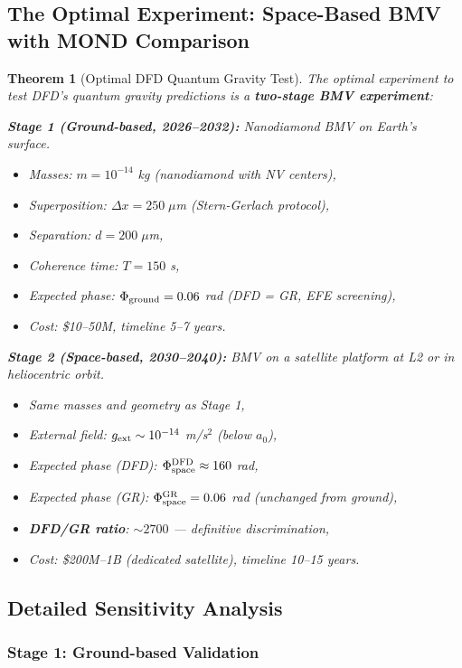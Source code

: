 \documentclass[11pt,a4paper]{article}
\newtheorem{theorem}{Theorem}
\begin{document}
\subsection{The Optimal Experiment: Space-Based BMV with MOND Comparison}

\begin{theorem}[Optimal DFD Quantum Gravity Test]
\label{thm:optimal-experiment}
The optimal experiment to test DFD's quantum gravity predictions is a \textbf{two-stage BMV experiment}:

\textbf{Stage 1 (Ground-based, 2026--2032):} Nanodiamond BMV on Earth's surface.
\begin{itemize}
\item Masses: $m = 10^{-14}$ kg (nanodiamond with NV centers),
\item Superposition: $\Delta x = 250\;\mu$m (Stern-Gerlach protocol),
\item Separation: $d = 200\;\mu$m,
\item Coherence time: $T = 150$ s,
\item Expected phase: $\Phi_{\rm ground} = 0.06$ rad (DFD = GR, EFE screening),
\item Cost: \$10--50M, timeline 5--7 years.
\end{itemize}

\textbf{Stage 2 (Space-based, 2030--2040):} BMV on a satellite platform at L2 or in heliocentric orbit.
\begin{itemize}
\item Same masses and geometry as Stage 1,
\item External field: $g_{\rm ext} \sim 10^{-14}$ m/s$^2$ (below $a_0$),
\item Expected phase (DFD): $\Phi_{\rm space}^{\rm DFD} \approx 160$ rad,
\item Expected phase (GR): $\Phi_{\rm space}^{\rm GR} = 0.06$ rad (unchanged from ground),
\item \textbf{DFD/GR ratio}: $\sim 2700$ --- definitive discrimination,
\item Cost: \$200M--1B (dedicated satellite), timeline 10--15 years.
\end{itemize}
\end{theorem}

\subsection{Detailed Sensitivity Analysis}

\subsubsection{Stage 1: Ground-based Validation}
\end{document}
